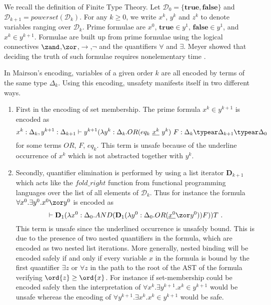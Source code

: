 We recall the definition of Finite Type Theory. Let $\mathcal{D}_0 = \{\mathbf{true},\mathbf{false}\}$ and $\mathcal{D}_{k+1} =powerset(\mathcal{D}_k)$.
For any $k\geq0$, we write $x^k$, $y^k$ and $z^k$ to denote variables ranging over $\mathcal{D}_k$. Prime formulae are $x^0$, $\mathbf{true}\in y^1$, $\mathbf{false}\in y^1$, and  $x^k \in y^{k+1}$. Formulae are built up from prime formulae using the logical connectives $\zand$,$\zor$,$\rightarrow$,$\neg$ and the quantifiers
$\forall$ and $\exists$. Meyer showed that deciding the truth of such formulae requires nonelementary time \cite{Meyer1974}.
\smallskip

In Mairson's encoding, variables of a given order $k$ are all encoded by terms of the same type $\Delta_k$. Using this encoding,
unsafety manifests itself in two different ways.
\begin{enumerate}[1.]
  \item
        First in the encoding of set membership. The prime formula $x^k \in y^{k+1}$ is encoded as \begin{equation} x^k : \Delta_k, y^{k+1}:\Delta_{k+1} \vdash y^{k+1} (\lambda y^k : \Delta_k . OR (eq_k~\underline{x^k}~y^k)~F : \Delta_k \typear \Delta_{k+1} \typear \Delta_0 \label{eqn:setmembership}\end{equation}
for some terms $OR$, $F$, $eq_k$.
This term is unsafe because of the underline occurrence of $x^k$ which is not abstracted together with $y^k$.

\item Secondly, quantifier elimination is performed by using a list iterator $\mathbf{D}_{k+1}$ which acts like the $fold\_right$ function from functional programming languages over the list of all elements of $\mathcal{D}_k$.
Thus for instance the formula $\forall x^0 . \exists y^0 . x^0 \zor y^0$
is encoded as $$\vdash \mathbf{D}_1 (\lambda x^0:\Delta_0. AND (\mathbf{D}_1 (\lambda y^0:\Delta_0. OR (\underline{x^0} \zor y^0)) F)) T \ .$$
This term is unsafe since the underlined occurrence is unsafely bound. This is due to the presence of two nested quantifiers in the formula, which are encoded as two nested list iterations. More generally, nested binding will be encoded safely if and only if every variable $x$ in the formula is bound by the first quantifier $\exists z$ or $\forall z$ in the path to the root of the AST of the formula verifying $\ord{z} \geq \ord{x}$. For instance if set-membership could be encoded safely then the interpretation of $\forall x^k . \exists y^{k+1} . x^k \in y^{k+1}$ would be unsafe whereas the encoding of $\forall y^{k+1} . \exists x^k . x^k \in y^{k+1}$ would be safe.
\end{enumerate}

